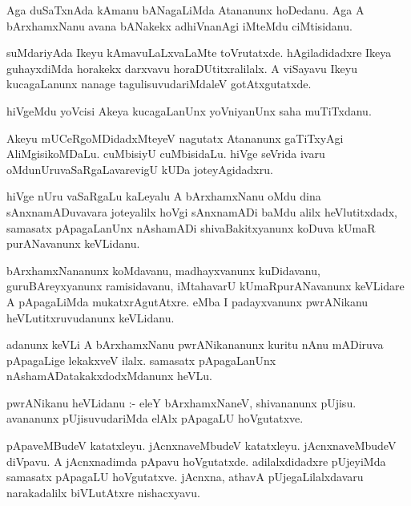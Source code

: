 \documentclass{article}
\begin{document}
\begin{mn}
Aga  duSaTxnAda  kAmanu  bANagaLiMda  Atananunx  hoDedanu.  Aga  A  bArxhamxNanu  avana  bANakekx  adhiVnanAgi  iMteMdu  ciMtisidanu.
\end{mn}

\begin{mn}
suMdariyAda  Ikeyu  kAmavuLaLxvaLaMte  toVrutatxde.  hAgiladidadxre  Ikeya  guhayxdiMda  horakekx  darxvavu  
horaDUtitxralilalx.  A  viSayavu  Ikeyu  kucagaLanunx  nanage  tagulisuvudariMdaleV  gotAtxgutatxde.
\end{mn}

\begin{mn}
hiVgeMdu  yoVcisi  Akeya  kucagaLanUnx  yoVniyanUnx  saha muTiTxdanu.
\end{mn}

\begin{mn}
Akeyu  mUCeRgoMDidadxMteyeV  nagutatx  Atananunx  gaTiTxyAgi  AliMgisikoMDaLu.  cuMbisiyU  cuMbisidaLu.  
hiVge  seVrida  ivaru  oMdunUruvaSaRgaLavarevigU  kUDa  joteyAgidadxru.
\end{mn}

\begin{mn}
hiVge  nUru  vaSaRgaLu  kaLeyalu  A  bArxhamxNanu  oMdu  dina  sAnxnamADuvavara  joteyalilx  hoVgi  sAnxnamADi  baMdu  
alilx  heVlutitxdadx,  samasatx  pApagaLanUnx  nAshamADi  shivaBakitxyanunx  koDuva  kUmaR  purANavanunx  keVLidanu.
\end{mn}

\begin{mn}
bArxhamxNananunx  koMdavanu,  madhayxvanunx  kuDidavanu,  guruBAreyxyanunx  ramisidavanu,  iMtahavarU  kUmaRpurANavanunx  
keVLidare  A  pApagaLiMda  mukatxrAgutAtxre.  eMba  I  padayxvanunx  pwrANikanu  heVLutitxruvudanunx  keVLidanu.
\end{mn}

\begin{mn}
adanunx  keVLi  A  bArxhamxNanu  pwrANikananunx  kuritu  nAnu  mADiruva  pApagaLige  lekakxveV  ilalx.  samasatx  
pApagaLanUnx  nAshamADatakakxdodxMdanunx  heVLu.
\end{mn}

\begin{mn}
pwrANikanu  heVLidanu :- eleY  bArxhamxNaneV,  shivananunx  pUjisu.  avananunx  pUjisuvudariMda  elAlx  pApagaLU  hoVgutatxve.
\end{mn}

\begin{mn}
pApaveMBudeV  katatxleyu.  jAcnxnaveMbudeV  katatxleyu.  jAcnxnaveMbudeV  diVpavu.  A  jAcnxnadimda  pApavu  hoVgutatxde.  
adilalxdidadxre  pUjeyiMda  samasatx  pApagaLU  hoVgutatxve.  jAcnxna,  athavA  pUjegaLilalxdavaru  narakadalilx  biVLutAtxre  nishacxyavu.
\end{mn}
\end{document}
